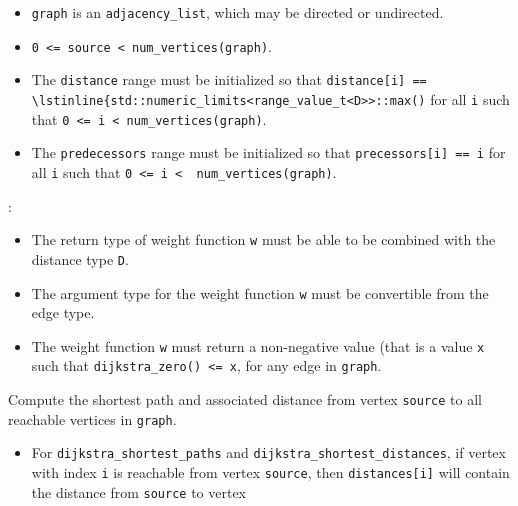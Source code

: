 \begin{itemdescr}
      \pnum\preconditions
      \begin{itemize}
            \item
                  \lstinline{graph} is an \lstinline{adjacency_list}, which may be directed or
                  undirected.
            \item
                  \lstinline{0 <= source < num_vertices(graph)}.
            \item
                  The \lstinline{distance} range must be initialized so that
                  \lstinline{distance[i] == \lstinline{std::numeric_limits<range_value_t<D>>::max()}
                  for all \lstinline{i}
                  such that \lstinline{0 <= i < num_vertices(graph)}.  
            \item
                  The \lstinline{predecessors} range must be initialized so that
                  \lstinline{precessors[i] == i} for all \lstinline{i} such that
                  \lstinline{0 <= i <  num_vertices(graph)}.
      \end{itemize}
      \pnum\requires:
      \begin{itemize}
            \item
                  The return type of weight function \lstinline{w} must be able to
                  be combined with the distance type \lstinline{D}.
            \item
                  The argument type for the weight
                  function \lstinline{w} must be convertible from the edge type.
            \item
                  The weight function \lstinline{w} must return a non-negative value (that is
                  a value \lstinline{x} such that \lstinline{dijkstra_zero() <= x},
                  for any edge in \lstinline{graph}.
      \end{itemize}
      \pnum\effects
      Compute the shortest path and associated distance from vertex
      \lstinline{source} to all reachable vertices in \lstinline{graph}.
      \pnum\returns
      \begin{itemize}
            \item
                  For \lstinline{dijkstra_shortest_paths} and \lstinline{dijkstra_shortest_distances},
                  if vertex with index \lstinline{i} is reachable from vertex \lstinline{source}, then
                  \lstinline{distances[i]} will contain the distance from \lstinline{source} to vertex

\end{itemize}
\end{itemdescr}
